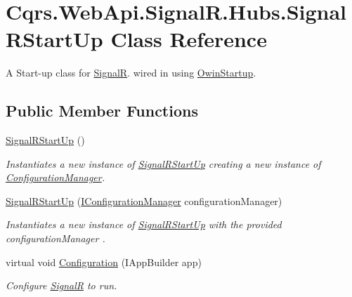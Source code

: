 \hypertarget{classCqrs_1_1WebApi_1_1SignalR_1_1Hubs_1_1SignalRStartUp}{}\section{Cqrs.\+Web\+Api.\+Signal\+R.\+Hubs.\+Signal\+R\+Start\+Up Class Reference}
\label{classCqrs_1_1WebApi_1_1SignalR_1_1Hubs_1_1SignalRStartUp}


A Start-\/up class for \hyperlink{namespaceCqrs_1_1WebApi_1_1SignalR}{SignalR}. wired in using \hyperlink{}{Owin\+Startup}.  


\subsection*{Public Member Functions}
\begin{DoxyCompactItemize}
\item 
\hyperlink{classCqrs_1_1WebApi_1_1SignalR_1_1Hubs_1_1SignalRStartUp_a5d042d52b0c5671b7be52f69c05ec371_a5d042d52b0c5671b7be52f69c05ec371}{Signal\+R\+Start\+Up} ()
\begin{DoxyCompactList}\small\item\em Instantiates a new instance of \hyperlink{classCqrs_1_1WebApi_1_1SignalR_1_1Hubs_1_1SignalRStartUp}{Signal\+R\+Start\+Up} creating a new instance of \hyperlink{classCqrs_1_1WebApi_1_1SignalR_1_1Hubs_1_1SignalRStartUp_a0c137e0c86431dc944d7a3415de011bb_a0c137e0c86431dc944d7a3415de011bb}{Configuration\+Manager}. \end{DoxyCompactList}\item 
\hyperlink{classCqrs_1_1WebApi_1_1SignalR_1_1Hubs_1_1SignalRStartUp_a52cbff947cf5da34dd8487c60ab85321_a52cbff947cf5da34dd8487c60ab85321}{Signal\+R\+Start\+Up} (\hyperlink{interfaceCqrs_1_1Configuration_1_1IConfigurationManager}{I\+Configuration\+Manager} configuration\+Manager)
\begin{DoxyCompactList}\small\item\em Instantiates a new instance of \hyperlink{classCqrs_1_1WebApi_1_1SignalR_1_1Hubs_1_1SignalRStartUp}{Signal\+R\+Start\+Up} with the provided {\itshape configuration\+Manager} . \end{DoxyCompactList}\item 
virtual void \hyperlink{classCqrs_1_1WebApi_1_1SignalR_1_1Hubs_1_1SignalRStartUp_a0d670a1f640c6fd19edda463fe708879_a0d670a1f640c6fd19edda463fe708879}{Configuration} (I\+App\+Builder app)
\begin{DoxyCompactList}\small\item\em Configure \hyperlink{namespaceCqrs_1_1WebApi_1_1SignalR}{SignalR} to run. \end{DoxyCompactList}\end{DoxyCompactItemize}
